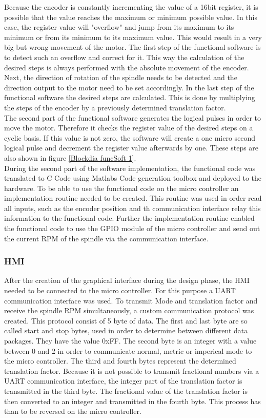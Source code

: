Because the encoder is constantly incrementing the value of a 16bit register, it is possible that the value reaches the maximum or minimum possible value. In this case, the register value will "overflow" and jump from its maximum to its minimum or from its minimum to its maximum value. This would result in a very big but wrong movement of the motor. The first step of the functional software is to detect such an overflow and correct for it. This way the calculation of the desired steps is always performed with the absolute movement of the encoder. Next, the direction of rotation of the spindle needs to be detected and the direction output to the motor need to be set accordingly. In the last step of the functional software the desired steps are calculated. This is done by multiplying the steps of the encoder by a previously determined translation factor.\\

The second part of the functional software generates the logical pulses in order to move the motor. Therefore it checks the register value of the desired steps on a cyclic basis. If this value is not zero, the software will create a one micro second logical pulse and decrement the register value afterwards by one. These steps are also shown in figure \ref{Blockdia funcSoft 1}.\\
During the second part of the software implementation, the functional code was translated to C Code using Matlabs Code generation toolbox and deployed to the hardware. To be able to use the functional code on the micro controller an implementation routine needed to be created. This routine was used in order read all inputs, such as the encoder position and th communication interface relay this information to the functional code. Further the implementation routine enabled the functional code to use the GPIO module of the micro controller and send out the current RPM of the spindle via the communication interface.

\subsubsection{HMI}
After the creation of the graphical interface during the design phase, the HMI needed to be connected to the micro controller. For this purpose a UART communication interface was used. To transmit Mode and translation factor and receive the spindle RPM simultaneously, a custom communication protocol was created. This protocol consist of 5 byte of data. The first and last byte are so called start and stop bytes, used in order to determine between different data packages. They have the value 0xFF. The second byte is an integer with a value between 0 and 2 in order to communicate normal, metric or imperical mode to the micro controller. The third and fourth bytes represent the determined translation factor. Because it is not possible to transmit fractional numbers via a UART communication interface, the integer part of the translation factor is transmitted in the third byte. The fractional value of the translation factor is then converted to an integer and transmitted in the fourth byte. This process has than to be reversed on the micro controller.

